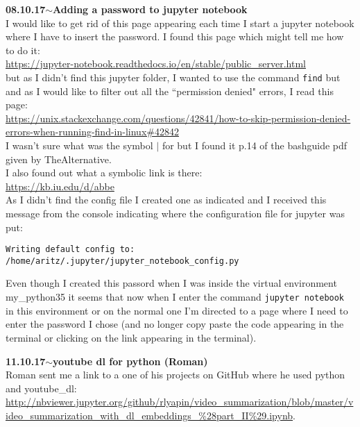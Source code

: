 \documentclass[11pt,a4paper]{article}
\newenvironment{loggentry}[2]%
{\noindent\textbf{#1}\hspace{1cm}$\mathbf{\sim}$\text{ }\textbf{#2}\\}{\vspace{0.5cm}}
\begin{document}
\begin{loggentry}{08.10.17}{Adding a password to jupyter notebook}
I would like to get rid of this page appearing each time I start a jupyter notebook where I have to insert the password. I found this page which might tell me how to do it:\\
\url{https://jupyter-notebook.readthedocs.io/en/stable/public_server.html}\\
but as I didn't find this jupyter folder, I wanted to use the command \texttt{find} but and as I would like to filter out all the ``permission denied" errors, I read this page:\\
\url{https://unix.stackexchange.com/questions/42841/how-to-skip-permission-denied-errors-when-running-find-in-linux#42842}\\
I wasn't sure what was the symbol $|$ for but I found it p.14 of the bashguide pdf given by TheAlternative.\\
I also found out what a symbolic link is there:\\
\url{https://kb.iu.edu/d/abbe}\\
As I didn't find the config file I created one as indicated and I received this message from the console indicating where the configuration file for jupyter was put:
\begin{verbatim}
Writing default config to: /home/aritz/.jupyter/jupyter_notebook_config.py
\end{verbatim}
Even though I created this passord when I was inside the virtual environment my\_python35 it seems that now when I enter the command \texttt{jupyter notebook} in this environment or on the normal one I'm directed to a page where I need to enter the password I chose (and no longer copy paste the code appearing in the terminal or clicking on the link appearing in the terminal).\\
\end{loggentry}

\begin{loggentry}{11.10.17}{youtube dl for python (Roman)}
Roman sent me a link to a one of his projects on GitHub where he used python and youtube\_dl:\\
\url{http://nbviewer.jupyter.org/github/rlyapin/video_summarization/blob/master/video_summarization_with_dl_embeddings_%28part_II%29.ipynb}.
\end{loggentry}
\end{document}
